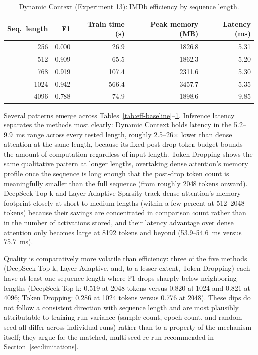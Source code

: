 \documentclass[11pt]{article}
\begin{document}
\FloatBarrier
\begin{table}[H]
  \centering
  \small
  \caption{Dynamic Context (Experiment 13): IMDb efficiency by sequence
  length.}
  \label{tab:eff-dynamiccontext}
  \begin{tabular}{@{}rrrrr@{}}
    \toprule
    Seq.\ length & F1 & Train time (s) & Peak memory (MB) & Latency (ms) \\
    \midrule
    256    & 0.000 & 26.9  & 1826.8 & 5.31 \\
    512    & 0.909 & 65.5  & 1862.3 & 5.20 \\
    768    & 0.919 & 107.4 & 2311.6 & 5.30 \\
    1024   & 0.942 & 566.4 & 3457.7 & 5.35 \\
    4096   & 0.788 & 74.9  & 1898.6 & 9.85 \\
    \bottomrule
  \end{tabular}
\end{table}

Several patterns emerge across Tables~\ref{tab:eff-baseline}--\ref{tab:eff-dynamiccontext}.
Inference latency separates the methods most clearly: Dynamic Context holds
latency in the 5.2--9.9~ms range across every tested length, roughly
2.5--26$\times$ lower than dense attention at the same length, because its
fixed post-drop token budget bounds the amount of computation regardless of
input length. Token Dropping shows the same qualitative pattern at longer
lengths, overtaking dense attention's memory profile once the sequence is long
enough that the post-drop token count is meaningfully smaller than the full
sequence (from roughly 2048 tokens onward). DeepSeek Top-k and Layer-Adaptive
Sparsity track dense attention's memory footprint closely at short-to-medium
lengths (within a few percent at 512--2048 tokens) because their savings are
concentrated in comparison count rather than in the number of activations
stored, and their latency advantage over dense attention only becomes large
at 8192 tokens and beyond (53.9--54.6~ms versus 75.7~ms).

Quality is comparatively more volatile than efficiency: three of the five
methods (DeepSeek Top-k, Layer-Adaptive, and, to a lesser extent, Token
Dropping) each have at least one sequence length where F1 drops sharply below
neighboring lengths (DeepSeek Top-k: 0.519 at 2048 tokens versus 0.820 at 1024
and 0.821 at 4096; Token Dropping: 0.286 at 1024 tokens versus 0.776 at 2048).
These dips do not follow a consistent direction with sequence length and are
most plausibly attributable to training-run variance (sample count, epoch
count, and random seed all differ across individual runs) rather than to a
property of the mechanism itself; they argue for the matched, multi-seed
re-run recommended in Section~\ref{sec:limitations}.
\end{document}
